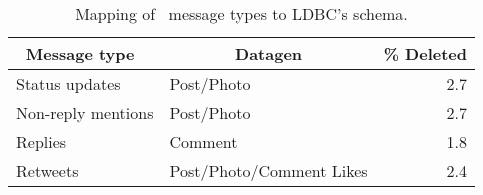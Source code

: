 \begin{table}[htb]
  \centering
  \begin{tabular}{ |l|l|r| }
    \hline
    \multicolumn{1}{|c|}{\textbf{Message type~\cite{DBLP:conf/cscw/AlmuhimediWLSA13}}} &
    \multicolumn{1}{c|}{\textbf{Datagen}} &
    \multicolumn{1}{c|}{\textbf{\% Deleted}} \\
    \hline\hline
    Status updates & Post/Photo & 2.7 \\
    \hline
    Non-reply mentions &  Post/Photo & 2.7 \\
    \hline
    Replies & Comment & 1.8 \\
    \hline
    Retweets & Post/Photo/Comment Likes & 2.4 \\
    \hline
  \end{tabular}
  \centering
  \caption{Mapping of~\cite{DBLP:conf/cscw/AlmuhimediWLSA13} message types to LDBC's schema.}
  \label{table:almuhimedi-mapping}
\end{table}
